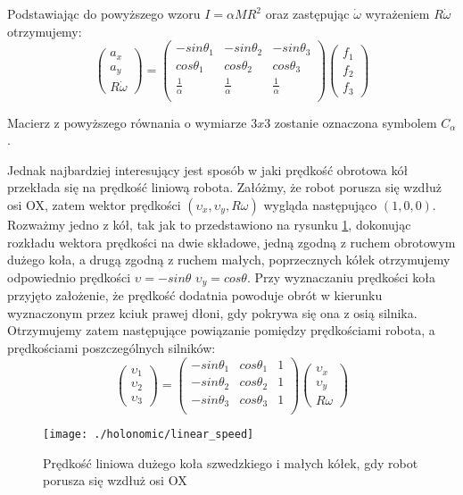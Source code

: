 Podstawiając do powyższego wzoru $I=\alpha MR^2$ oraz zastępując $\dot{\omega}$ wyrażeniem $R\dot{\omega}$ otrzymujemy:
\begin{equation}
 \begin{pmatrix}
  a_x\\
  a_y\\
  R\dot{\omega}
 \end{pmatrix}
  =
\begin{pmatrix}
  -sin\theta_1 & -sin\theta_2 & -sin\theta_3 \\
  cos\theta_1 & cos\theta_2 & cos\theta_3 \\
  \frac{1}{\alpha} & \frac{1}{\alpha} & \frac{1}{\alpha}\\
 \end{pmatrix} 
 \begin{pmatrix}
  f_1\\
  f_2\\
  f_3
 \end{pmatrix}
\end{equation}

Macierz z powyższego równania o wymiarze $3x3$ zostanie oznaczona symbolem $C_{\alpha}$.

Jednak najbardziej interesujący jest sposób w jaki prędkość obrotowa kół przekłada się na prędkość liniową robota.
Załóżmy, że robot porusza się wzdłuż osi OX, zatem wektor prędkości $(\upsilon_{x}, \upsilon_{y}, R\omega)$ wygląda następująco $(1,0,0)$.
Rozważmy jedno z kół, tak jak to przedstawiono na rysunku \ref{fig:linear_speed}, dokonując rozkładu wektora prędkości na dwie składowe, jedną zgodną z ruchem
obrotowym dużego koła, a drugą zgodną z ruchem małych, poprzecznych kółek otrzymujemy odpowiednio prędkości $\upsilon=-sin\theta$ $\upsilon_{y}=cos\theta$.
Przy wyznaczaniu prędkości koła przyjęto założenie, że prędkość dodatnia powoduje obrót w kierunku wyznaczonym przez kciuk prawej dłoni, gdy pokrywa się ona z osią 
silnika.
Otrzymujemy zatem następujące powiązanie pomiędzy prędkościami robota, a prędkościami poszczególnych silników:
 \begin{equation}
 \begin{pmatrix}
  \upsilon_1\\
  \upsilon_2\\
  \upsilon_3
 \end{pmatrix}
  =
\begin{pmatrix}
  -sin\theta_1 & cos\theta_1 & 1 \\
  -sin\theta_2 & cos\theta_2 & 1 \\
  -sin\theta_3 & cos\theta_3 & 1 \\
 \end{pmatrix} 
 \begin{pmatrix}
  \upsilon_x\\
  \upsilon_y\\
  R\omega
 \end{pmatrix}
\end{equation}
\begin{figure}[h]
\centering
\texttt{[image: ./holonomic/linear\_speed]}
\caption{ Prędkość liniowa dużego koła szwedzkiego i małych kółek, gdy robot porusza się wzdłuż osi OX }\label{fig:linear_speed}
\end{figure}

